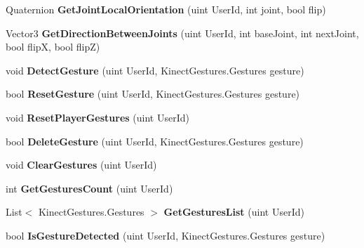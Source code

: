 \begin{DoxyCompactItemize}
Quaternion {\bfseries Get\+Joint\+Local\+Orientation} (uint User\+Id, int joint, bool flip)
\item 
\mbox{\label{class_kinect_manager_a5aaa167f101f8143c309300c6d8a0a21}} 
Vector3 {\bfseries Get\+Direction\+Between\+Joints} (uint User\+Id, int base\+Joint, int next\+Joint, bool flipX, bool flipZ)
\item 
\mbox{\label{class_kinect_manager_aaa496d55486a07be1bd33ab29c4aeb31}} 
void {\bfseries Detect\+Gesture} (uint User\+Id, Kinect\+Gestures.\+Gestures gesture)
\item 
\mbox{\label{class_kinect_manager_afc3ee5ab5f438c6b89b303cdfcd7c0ae}} 
bool {\bfseries Reset\+Gesture} (uint User\+Id, Kinect\+Gestures.\+Gestures gesture)
\item 
\mbox{\label{class_kinect_manager_afdc90787281b1b722a7369ccd82d219c}} 
void {\bfseries Reset\+Player\+Gestures} (uint User\+Id)
\item 
\mbox{\label{class_kinect_manager_a2ddd469d4fd9700e45561dc6a9d38f95}} 
bool {\bfseries Delete\+Gesture} (uint User\+Id, Kinect\+Gestures.\+Gestures gesture)
\item 
\mbox{\label{class_kinect_manager_abc1de536fb4facd54a3dc1f5b5cad2c0}} 
void {\bfseries Clear\+Gestures} (uint User\+Id)
\item 
\mbox{\label{class_kinect_manager_a3d88f366f8d3bc64bcb4acf789003bf6}} 
int {\bfseries Get\+Gestures\+Count} (uint User\+Id)
\item 
\mbox{\label{class_kinect_manager_a5e9bfb77ebeddcfdd41e5d147f3a2146}} 
List$<$ Kinect\+Gestures.\+Gestures $>$ {\bfseries Get\+Gestures\+List} (uint User\+Id)
\item 
\mbox{\label{class_kinect_manager_a5429e07bee4a98d43fb944944773478f}} 
bool {\bfseries Is\+Gesture\+Detected} (uint User\+Id, Kinect\+Gestures.\+Gestures gesture)
\item 
\mbox{\label{class_kinect_manager_a4ac2e1fa4bb8dd384e81762e1aded2a4}} 

\end{DoxyCompactItemize}
